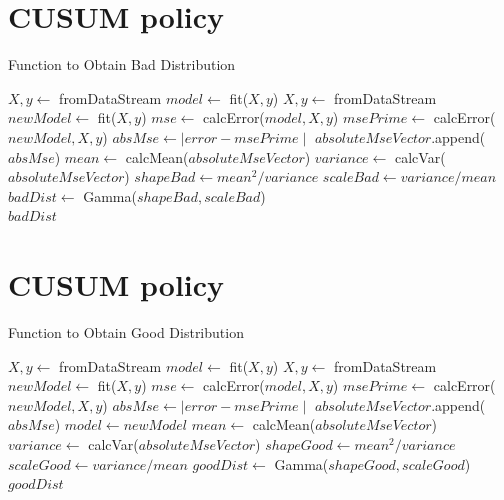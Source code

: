 \documentclass{mpaper}
\begin{document}




\begin{appendix}

\section{CUSUM policy}\label{baddist}
\begin{algorithm}[h]
\caption{Function to Obtain Bad Distribution}
\begin{algorithmic}
    \State $X, y \gets$ fromDataStream
    \State $model \gets$ fit($X,y$)
        \State $X, y \gets$ fromDataStream
        \State $newModel \gets$ fit($X,y$)
        \State $mse \gets$ calcError($model,X,y$)
        \State $msePrime \gets$ calcError($newModel,X,y$)
        \State $absMse \gets \mid error - msePrime \mid$
        \State $absoluteMseVector$.append($absMse$)
    \EndFor
    \State $mean \gets$ calcMean($absoluteMseVector$)
    \State $variance \gets$ calcVar($absoluteMseVector$)
    \State $shapeBad \gets mean^2/variance$
    \State $scaleBad \gets variance/mean$
    \State $badDist \gets$ Gamma($shapeBad, scaleBad$)\\
    \Return $badDist$
\EndFunction
\end{algorithmic}
\end{algorithm}

\newpage

\section{CUSUM policy}\label{gooddist}
\begin{algorithm}[h]
\caption{Function to Obtain Good Distribution}
\begin{algorithmic}
    \State $X, y \gets$ fromDataStream
    \State $model \gets$ fit($X,y$)
        \State $X, y \gets$ fromDataStream
        \State $newModel \gets$ fit($X,y$)
        \State $mse \gets$ calcError($model,X,y$)
        \State $msePrime \gets$ calcError($newModel,X,y$)
        \State $absMse \gets \mid error - msePrime \mid$
        \State $absoluteMseVector$.append($absMse$)
        \State $model \gets newModel$
    \EndFor
    \State $mean \gets$ calcMean($absoluteMseVector$)
    \State $variance \gets$ calcVar($absoluteMseVector$)
    \State $shapeGood \gets mean^2/variance$
    \State $scaleGood \gets variance/mean$
    \State $goodDist \gets$ Gamma($shapeGood, scaleGood$)\\
    \Return $goodDist$
\EndFunction
\end{algorithmic}
\end{algorithm}


\end{appendix}
\end{document}
